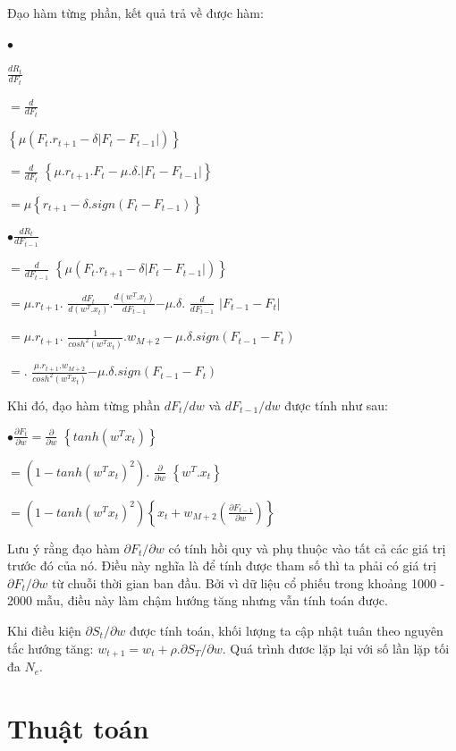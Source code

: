\documentclass[14pt]{extreport}
\begin{document}
Đạo hàm từng phần, kết quả trả về được hàm:

$\bullet$ {\Large $\frac{dR_t}{dF_t}$ 

 $=\frac{d}{dF_t} $ } $\left \{ \mu\left ( F_{t}.r_{t+1}-\delta\left | F_t-F_{t-1} \right | \right ) \right \}$


{\Large $=\frac{d}{dF_t}$ } $\left \{ \mu.r_{t+1}.F_t -\mu.\delta.\left | F_t-F_{t-1} \right | \right \}$


$= \mu \left \{ r_{t+1} - \delta.sign\left ( F_t-F_{t-1} \right ) \right \}$

{\Large $\bullet \frac{dR_t}{dF_{t-1}}$} 

{\Large$=\frac{d}{dF_{t-1}}$ }$\left \{ \mu\left ( F_{t}.r_{t+1}-\delta\left | F_t-F_{t-1} \right | \right ) \right \}$
 
 $=\mu.r_{t+1}.$ {\Large $\frac{dF_t}{d(w^T.x_t)}.\frac{d(w^T.x_t)}{dF_{t-1}}$}$-\mu.\delta.$ {\Large $\frac{d}{dF_{t-1}}$} $\left|F_{t-1}-F_t \right|$
 
 $=\mu.r_{t+1}.$ {\Large $\frac{1}{cosh^2(w^Tx_t)}$}$.w_{M+2}-\mu.\delta.sign\left(F_{t-1}-F_t \right)$

 $=.$ {\Large $\frac{\mu.r_{t+1}.w_{M+2}}{cosh^2(w^Tx_t)}$}$-\mu.\delta.sign\left(F_{t-1}-F_t \right)$


Khi đó, đạo hàm từng phần $dF_t/dw$ và $dF_{t-1}/dw$ được tính như sau:

{\Large $\bullet\frac{\partial F_t}{\partial w} = \frac{\partial}{\partial w}$ }$\left \{ tanh(w^Tx_t) \right \}$

$=\left ( 1-tanh\left ( w^Tx_t \right )^2 \right ).$ {\Large$\frac{\partial}{\partial w}$ } $\left \{ w^T.x_t \right \}$

$=\left ( 1-tanh\left ( w^Tx_t \right )^2 \right )\left \{ x_t+w_{M+2} \left(\frac{\partial F_{t-1}}{\partial w}\right)\right \}$

Lưu ý rằng đạo hàm $\partial F_t/\partial w$ có tính hồi quy và phụ thuộc vào tất cả các giá trị trước đó của nó. Điều này nghĩa là để tính được tham số thì ta phải có giá trị $\partial F_t/\partial w$ từ chuỗi thời gian ban đầu. Bởi vì dữ liệu cổ phiếu trong khoảng 1000 - 2000 mẫu, điều này làm chậm hướng tăng nhưng vẫn tính toán được.

Khi điều kiện $\partial S_t/\partial w$ được tính toán, khối lượng ta cập nhật tuân theo nguyên tắc hướng tăng: $w_{t+1}=w_t+\rho.\partial S_T/\partial w$. Quá trình đươc lặp lại với số lần lặp tối đa $N_e$.

\section{Thuật toán}
\end{document}
